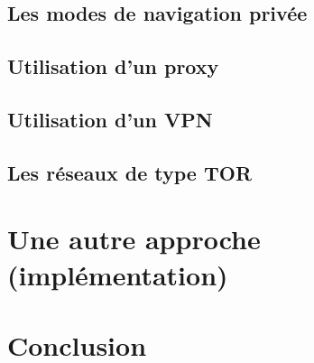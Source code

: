 \documentclass[a4paper,12pt,french]{report}
\begin{document}
	\section{Les modes de navigation privée}
		
	\section{Utilisation d'un proxy}
		
	\section{Utilisation d'un VPN}
			
	\section{Les réseaux de type TOR}

\chapter{Une autre approche (implémentation)}

\chapter{Conclusion}
\end{document}

